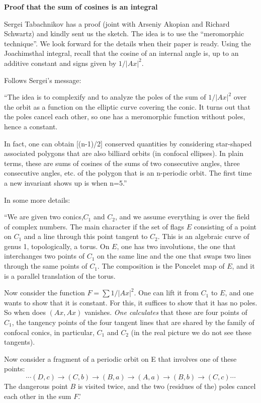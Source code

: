 \documentclass[11pt]{article}
\begin{document}
\begin{center}
{\bf {\large
Proof that the sum of cosines is an integral}}
\end{center}

Sergei Tabachnikov has a proof (joint with Arseniy Akopian and Richard Schwartz) and kindly sent us the sketch.  The idea is to use the
``meromorphic technique''.  We look forward for the details when their paper is ready.   Using  the Joachimsthal integral, recall that the cosine
of an internal angle is, up to an additive constant and signs given by  $1/|Ax|^2$.  

Follows Sergei's message:

``The idea is to complexify and to analyze the poles of the sum of  $1/|Ax|^2 $ over the orbit as a function on the elliptic curve covering the conic.
It turns out that the poles cancel each other, so one has a meromorphic function without poles, hence a constant.

In fact, one can obtain [(n-1)/2] conserved quantities by considering star-shaped associated polygons that are also billiard orbits (in confocal ellipses). 
In plain terms, these are sums of cosines of the sums of two consecutive angles, three consecutive angles, etc. of the polygon that is an n-periodic orbit. 
The first time a new invariant shows up is when n=5.''

In some more details:

``We are given two conics,$ C_1$ and $C_2$, and we assume everything is over the field of complex numbers.
The main character if the set of flags $E$ consisting of a point on $C_1$ and a line through this point tangent to $C_2$. This is an algebraic curve of genus 1, topologically, a torus.
 On $E$, one has two involutions, the one that interchanges two points of $C_1$ on the same line and the one that swaps two lines through the same points of $C_1$. The composition is the Poncelet map of $E$, and it is a parallel translation of the torus.
 
Now consider the function $F=\sum 1/|Ax|^2$. One can lift it from $C_1$ to $E$, and one wants to show that it is constant. For this, it suffices to show that it has no poles. So when does $(Ax,Ax)$ vanishes.   {\it One calculates} that these are four points of $C_1$, the tangency points of the four tangent lines that are shared by the family of confocal conics, in particular, $C_1$ and $C_2$ (in the real picture we do not  see these tangents).

Now consider a fragment of a periodic orbit on E that involves one of these points:
$$ \cdots (D,c)  \to  (C,b) \to  (B,a)  \to (A,a) \to (B,b)\to  (C,c) \cdots $$
The dangerous point $B$ is visited twice, and the two (residues of the) poles cancel each other in the sum $  F$.'
\end{document}
